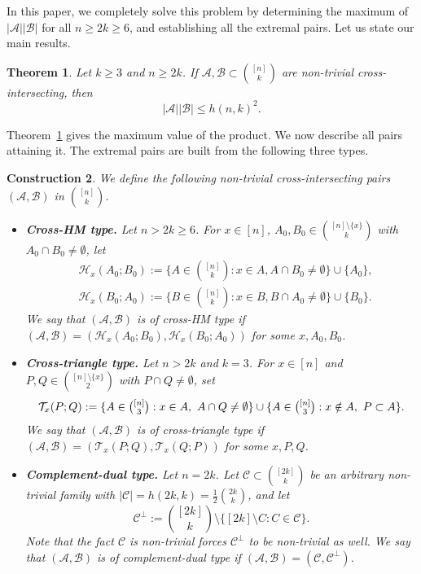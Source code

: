 \documentclass[a4paper,11pt]{article}
\newtheorem{theorem}{Theorem}[section]
\newtheorem{construction}[theorem]{Construction}
\newcommand{\m}{\mathcal}
\begin{document}
In this paper, we completely solve this problem by determining the maximum of $|\mathcal{A}| |\mathcal{B}|$ for all $n\ge 2k\ge 6$, and establishing all the extremal pairs. Let us state our main results.  
\begin{theorem}\label{thm:main}
Let $k \ge 3$ and $n\ge 2k$. If $\mathcal{A}, \mathcal{B} \subset {[n]\choose k}$ are non-trivial cross-intersecting, then  
\[
|\mathcal{A}||\mathcal{B}|\le h(n, k)^2. 
\]
\end{theorem}

Theorem~\ref{thm:main} gives the maximum value of the
product. We now describe all pairs attaining it. The
extremal pairs are built from the following three types.

\begin{construction}\label{extremal}
We define the following non-trivial cross-intersecting
pairs $(\m A,\m B)$ in $\binom{[n]}{k}$.

\smallskip
\begin{itemize}
\item {\bf Cross-HM type.} Let $n>2k\ge 6$. For $x\in[n]$,
$A_0,B_0\in\binom{[n]\setminus\{x\}}{k}$ with
$A_0\cap B_0\ne\emptyset$, let
\begin{align*}
&\m H_x(A_0;B_0):=\{A\in \binom{[n]}{k}: x\in A, A\cap B_0\ne \emptyset\}\cup \{A_0\},\\
&\m H_x(B_0;A_0):=\{B\in \binom{[n]}{k}: x\in B, B\cap A_0\ne \emptyset\}\cup \{B_0\}.
\end{align*}
We say that $(\m A, \m B)$ is of cross-HM type if $(\m A, \m B)=(\m H_x(A_0;B_0),\m H_x(B_0;A_0))$ for some $x,A_0,B_0$.
\item {\bf Cross-triangle type.} Let $n>2k$ and $k=3$. For $x\in[n]$ and
$P,Q\in\binom{[n]\setminus\{x\}}{2}$ with $P\cap Q\ne\emptyset$, set
\begin{align*}
\m T_x(P;Q):=\{A\in \tbinom{[n]}{3}: x\in A,\ A\cap Q\ne\emptyset\}
\cup\{A\in \tbinom{[n]}{3}: x\notin A,\ P\subset A\}.
\end{align*}
We say that $(\m A,\m B)$ is of cross-triangle type if
$(\m A,\m B)=(\m T_x(P;Q),\m T_x(Q;P))$ for some $x,P,Q$.
\item {\bf Complement-dual type.} Let $n=2k$. Let $\m C\subset\binom{[2k]}{k}$ be an arbitrary non-trivial family
with $|\m C|=h(2k,k)=\tfrac12\binom{2k}{k}$, and let 
\[
\m C^{\perp}:=\binom{[2k]}{k}\setminus\{[2k]\setminus C: C\in \m C\}.
\]
Note that the fact $\m C$ is non-trivial forces $\m C^{\perp}$ to be non-trivial as well.
We say that $(\m A, \m B)$ is of complement-dual type if $(\m A, \m B)=(\m C,\m C^{\perp})$.
\end{itemize}
\end{construction}
\end{document}
